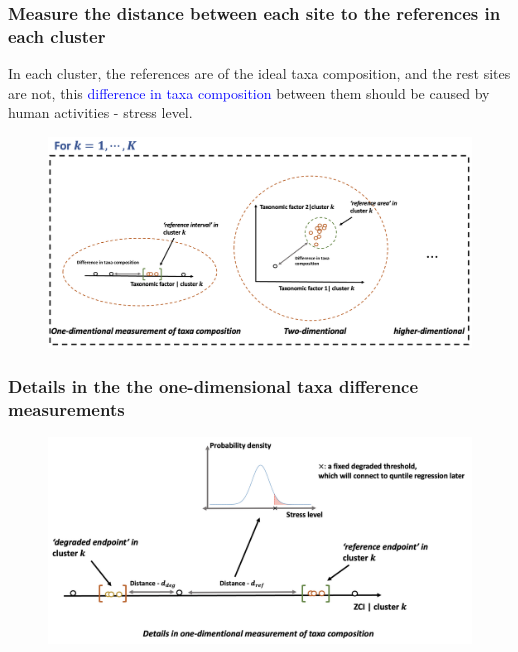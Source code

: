 \documentclass{beamer}
\begin{document}
\begin{frame}
\frametitle{Measure the distance between each site to the references in each cluster}

In each cluster, the references are of the ideal taxa composition, and the rest sites are 
not, this \textcolor{blue}{difference in taxa composition} between them
should be caused by human activities - stress level.

\begin{figure}
\centering
\includegraphics[width=\textwidth]{figures/p_14_differences_in_taxa_across_clusters.png}
\end{figure}

\end{frame}

\begin{frame}
    \frametitle{Details in the the one-dimensional taxa difference measurements}

\begin{figure}
\centering
\includegraphics[width=\textwidth]{figures/p15_details_of_taxa_difference_in_1dimention.png}
\end{figure}

\end{frame}
\end{document}
